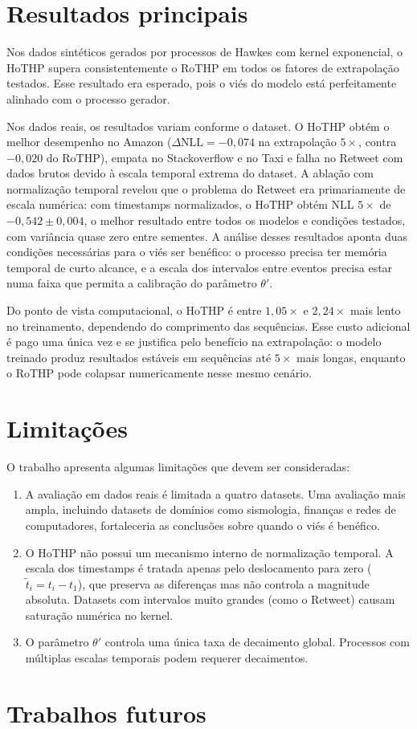 \section{Resultados principais}

Nos dados sintéticos gerados por processos de Hawkes com kernel exponencial, o HoTHP supera consistentemente o RoTHP em todos os fatores de extrapolação testados. Esse resultado era esperado, pois o viés do modelo está perfeitamente alinhado com o processo gerador.

Nos dados reais, os resultados variam conforme o dataset. O HoTHP obtém o melhor desempenho no Amazon ($\Delta\text{NLL} = -0{,}074$ na extrapolação $5\times$, contra $-0{,}020$ do RoTHP), empata no Stackoverflow e no Taxi e falha no Retweet com dados brutos devido à escala temporal extrema do dataset. A ablação com normalização temporal revelou que o problema do Retweet era primariamente de escala numérica: com timestamps normalizados, o HoTHP obtém NLL $5\times$ de $-0{,}542 \pm 0{,}004$, o melhor resultado entre todos os modelos e condições testados, com variância quase zero entre sementes. A análise desses resultados aponta duas condições necessárias para o viés ser benéfico: o processo precisa ter memória temporal de curto alcance, e a escala dos intervalos entre eventos precisa estar numa faixa que permita a calibração do parâmetro $\theta'$.

Do ponto de vista computacional, o HoTHP é entre $1{,}05\times$ e $2{,}24\times$ mais lento no treinamento, dependendo do comprimento das sequências. Esse custo adicional é pago uma única vez e se justifica pelo benefício na extrapolação: o modelo treinado produz resultados estáveis em sequências até $5\times$ mais longas, enquanto o RoTHP pode colapsar numericamente nesse mesmo cenário.

\section{Limitações}

O trabalho apresenta algumas limitações que devem ser consideradas:

\begin{enumerate}
    \item A avaliação em dados reais é limitada a quatro datasets. Uma avaliação mais ampla, incluindo datasets de domínios como sismologia, finanças e redes de computadores, fortaleceria as conclusões sobre quando o viés é benéfico.

    \item O HoTHP não possui um mecanismo interno de normalização temporal. A escala dos timestamps é tratada apenas pelo deslocamento para zero ($\tilde{t}_i = t_i - t_1$), que preserva as diferenças mas não controla a magnitude absoluta. Datasets com intervalos muito grandes (como o Retweet) causam saturação numérica no kernel.

    \item O parâmetro $\theta'$ controla uma única taxa de decaimento global. Processos com múltiplas escalas temporais podem requerer decaimentos.
\end{enumerate}

\section{Trabalhos futuros}
